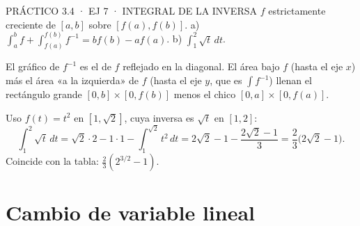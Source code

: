 \begin{enunciado}{PRÁCTICO 3.4 · EJ 7 · INTEGRAL DE LA INVERSA}
$f$ estrictamente creciente de $[a,b]$ sobre $[f(a),f(b)]$. a) $\int_a^bf+\int_{f(a)}^{f(b)}f^{-1}=bf(b)-af(a)$. b) $\int_1^2\sqrt t\,dt$.
\end{enunciado}
El gráfico de $f^{-1}$ es el de $f$ reflejado en la diagonal. El área bajo $f$ (hasta el eje $x$) más el área «a la izquierda» de $f$ (hasta el eje $y$, que es $\int f^{-1}$) llenan el rectángulo grande $[0,b]\times[0,f(b)]$ menos el chico $[0,a]\times[0,f(a)]$.
\begin{center}
\end{center}
Uso $f(t)=t^2$ en $[1,\sqrt2]$, cuya inversa es $\sqrt t$ en $[1,2]$:
\[\int_1^2\sqrt t\,dt=\sqrt2\cdot2-1\cdot1-\int_1^{\sqrt2}t^2\,dt=2\sqrt2-1-\frac{2\sqrt2-1}3=\frac23\big(2\sqrt2-1\big).\]
Coincide con la tabla: $\frac23(2^{3/2}-1)$.\ok

\section{Cambio de variable lineal}

